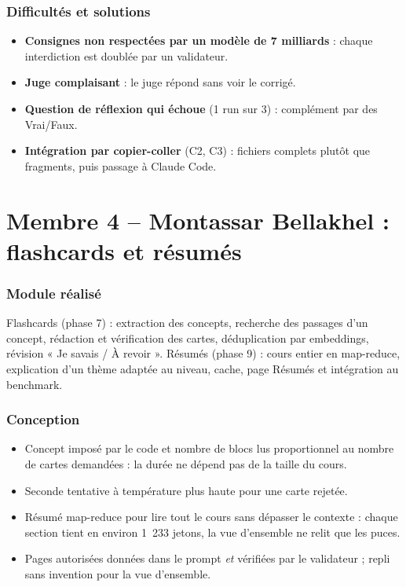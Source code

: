 \documentclass[12pt,a4paper]{report}
\newcommand{\membreQuatre}{Montassar Bellakhel}
\begin{document}
\subsubsection{Difficultés et solutions}
\begin{itemize}
  \item \textbf{Consignes non respectées par un modèle de 7 milliards} : chaque interdiction est doublée par
        un validateur.
  \item \textbf{Juge complaisant} : le juge répond sans voir le corrigé.
  \item \textbf{Question de réflexion qui échoue} (1 run sur 3) : complément par des Vrai/Faux.
  \item \textbf{Intégration par copier-coller} (C2, C3) : fichiers complets plutôt que fragments, puis
        passage à Claude Code.
\end{itemize}

\section{Membre 4 -- \membreQuatre{} : flashcards et résumés}
\label{sec:contrib-m4}

\subsubsection{Module réalisé}
Flashcards (phase 7) : extraction des concepts, recherche des passages d'un concept, rédaction et
vérification des cartes, déduplication par embeddings, révision « Je savais / À revoir ». Résumés
(phase 9) : cours entier en map-reduce, explication d'un thème adaptée au niveau, cache, page Résumés et
intégration au benchmark.

\subsubsection{Conception}
\begin{itemize}
  \item Concept imposé par le code et nombre de blocs lus proportionnel au nombre de cartes demandées :
        la durée ne dépend pas de la taille du cours.
  \item Seconde tentative à température plus haute pour une carte rejetée.
  \item Résumé map-reduce pour lire tout le cours sans dépasser le contexte : chaque section tient en
        environ 1~233 jetons, la vue d'ensemble ne relit que les puces.
  \item Pages autorisées données dans le prompt \emph{et} vérifiées par le validateur ; repli sans
        invention pour la vue d'ensemble.
\end{itemize}
\end{document}
